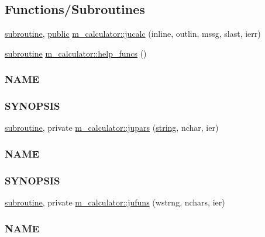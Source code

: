 \subsection*{Functions/\+Subroutines}
\begin{DoxyCompactItemize}
\item 
\hyperlink{M__stopwatch_83_8txt_acfbcff50169d691ff02d4a123ed70482}{subroutine}, \hyperlink{M__stopwatch_83_8txt_a2f74811300c361e53b430611a7d1769f}{public} \hyperlink{namespacem__calculator_a7a98aaf2fb03204125187dfec671ce1f}{m\+\_\+calculator\+::jucalc} (inline, outlin, mssg, slast, ierr)
\item 
\hyperlink{M__stopwatch_83_8txt_acfbcff50169d691ff02d4a123ed70482}{subroutine} \hyperlink{namespacem__calculator_a190e152c2fc309d59e75ee4645e6d261}{m\+\_\+calculator\+::help\+\_\+funcs} ()
\begin{DoxyCompactList}\small\item\em \subsubsection*{N\+A\+ME}

\subsubsection*{S\+Y\+N\+O\+P\+S\+IS}\end{DoxyCompactList}\item 
\hyperlink{M__stopwatch_83_8txt_acfbcff50169d691ff02d4a123ed70482}{subroutine}, private \hyperlink{namespacem__calculator_afabadeb80314b52e904de9865f67ea9d}{m\+\_\+calculator\+::jupars} (\hyperlink{what__overview_81_8txt_a74cb7e955273b9f9157b4f0c18a38849}{string}, nchar, ier)
\begin{DoxyCompactList}\small\item\em \subsubsection*{N\+A\+ME}

\subsubsection*{S\+Y\+N\+O\+P\+S\+IS}\end{DoxyCompactList}\item 
\hyperlink{M__stopwatch_83_8txt_acfbcff50169d691ff02d4a123ed70482}{subroutine}, private \hyperlink{namespacem__calculator_ab9afbbbd87dd1434f72853350afec2a6}{m\+\_\+calculator\+::jufuns} (wstrng, nchars, ier)
\begin{DoxyCompactList}\small\item\em \subsubsection*{N\+A\+ME}


\end{DoxyCompactList}
\end{DoxyCompactItemize}
